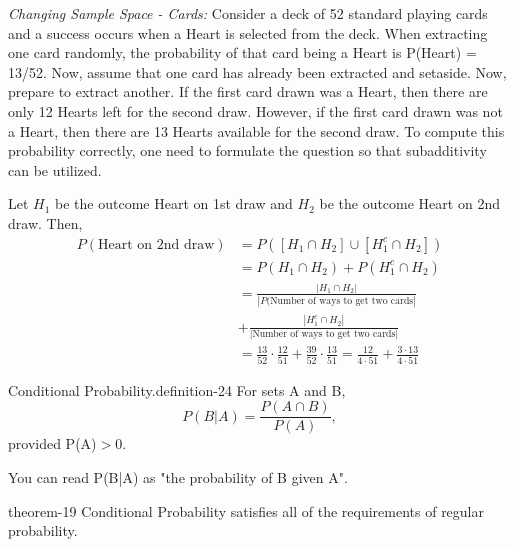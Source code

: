 \documentclass[10pt,]{book}
\numberwithin{equation}{section}
\newcommand{\gt}{>}
\begin{document}
\par
\hypertarget{p-549}{}%
\emph{Changing Sample Space - Cards:} Consider a deck of 52 standard playing cards and a success occurs when a Heart is selected from the deck. When extracting one card randomly, the probability	of that card being a Heart is P(Heart) = 13/52. Now, assume that one card has already been extracted and setaside.  Now, prepare to extract another. If the first card drawn was a Heart, then there are only 12 Hearts left for the second draw. However, if the first card drawn was not a Heart, then there are 13 Hearts available for the second draw. To compute this probability correctly, one need to formulate the question so that subadditivity can be utilized.%
\par
\hypertarget{p-550}{}%
Let \(H_1\) be the outcome Heart on 1st draw and \(H_2\) be the outcome Heart on 2nd draw. Then,%
\begin{align*}
P(\text{Heart on 2nd draw}) & = P( [ H_1 \cap H_2 ] \cup [ H_1^c \cap H_2 ] )\\
& = P( H_1 \cap H_2 ) + P( H_1^c \cap H_2 )\\
& = \frac{ | H_1 \cap H_2 |}{| P( \text{Number of ways to get two cards} | }\\
& + \frac{ | H_1^c \cap H_2 | }{ | \text{Number of ways to get two cards} | }\\
& = \frac{13}{52} \cdot \frac{12}{51} + \frac{39}{52} \cdot \frac{13}{51} = \frac{12}{4 \cdot 51} + \frac{3 \cdot 13}{4 \cdot 51}	
\end{align*}
%
\par
\hypertarget{p-551}{}%
\begin{definition}{Conditional Probability.}{definition-24}%
\hypertarget{p-552}{}%
For sets A and B,%
\begin{equation*}
P(B | A) = \frac{P(A \cap B)}{ P(A) },
\end{equation*}
provided P(A)\(\gt 0\).%
\end{definition}
%
\par
\hypertarget{p-553}{}%
You can read P(B|A) as "the probability of B given A".%
\par
\hypertarget{p-554}{}%
\begin{theorem}{}{}{theorem-19}%
\hypertarget{p-555}{}%
Conditional Probability satisfies all of the requirements of regular probability.%
\end{theorem}
\end{document}
